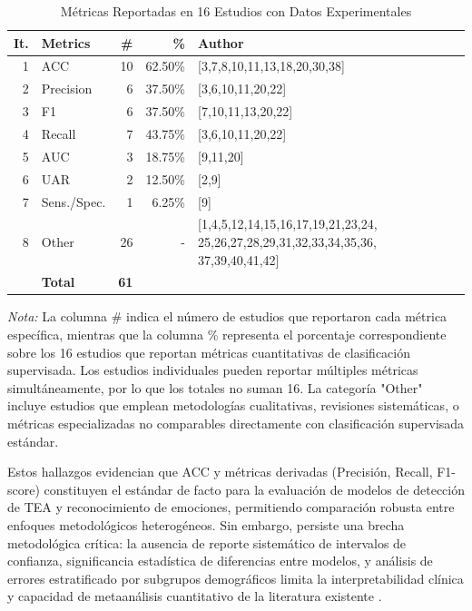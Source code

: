 \documentclass{ieeeaccess}
\begin{document}
	
	\begin{table}[htbp]
		\caption{Métricas Reportadas en 16 Estudios con Datos Experimentales}
		\label{tab:metricas}
		\centering
		\footnotesize
		\begin{tabular}{|r|l|r|r|p{110pt}|}
			\hline
			\textbf{It.} & \textbf{Metrics} & \textbf{\#} & \textbf{\%} & \textbf{Author} \\
			\hline
			1 & ACC & 10 & 62.50\% & [3,7,8,10,11,13,18,20,30,38] \\
			2 & Precision & 6 & 37.50\% & [3,6,10,11,20,22] \\
			3 & F1 & 6 & 37.50\% & [7,10,11,13,20,22] \\
			4 & Recall & 7 & 43.75\% & [3,6,10,11,20,22] \\
			5 & AUC & 3 & 18.75\% & [9,11,20] \\
			6 & UAR & 2 & 12.50\% & [2,9] \\
			7 & Sens./Spec. & 1 & 6.25\% & [9] \\
			8 & Other & 26 & - & [1,4,5,12,14,15,16,17,19,21,23,24, 25,26,27,28,29,31,32,33,34,35,36, 37,39,40,41,42] \\
			\hline
			& \textbf{Total} & \textbf{61} & & \\
			\hline
		\end{tabular}
		\begin{flushleft}
			\small \textit{Nota:} La columna \# indica el número de estudios que reportaron cada métrica específica, mientras que la columna \% representa el porcentaje correspondiente sobre los 16 estudios que reportan métricas cuantitativas de clasificación supervisada. Los estudios individuales pueden reportar múltiples métricas simultáneamente, por lo que los totales no suman 16. La categoría "Other" incluye estudios que emplean metodologías cualitativas, revisiones sistemáticas, o métricas especializadas no comparables directamente con clasificación supervisada estándar.
		\end{flushleft}
	\end{table}
	
	Estos hallazgos evidencian que ACC y métricas derivadas (Precisión, Recall, F1-score) constituyen el estándar de facto para la evaluación de modelos de detección de TEA y reconocimiento de emociones, permitiendo comparación robusta entre enfoques metodológicos heterogéneos. Sin embargo, persiste una brecha metodológica crítica: la ausencia de reporte sistemático de intervalos de confianza, significancia estadística de diferencias entre modelos, y análisis de errores estratificado por subgrupos demográficos limita la interpretabilidad clínica y capacidad de metaanálisis cuantitativo de la literatura existente \cite{b3,b11}.
	
\end{document}

